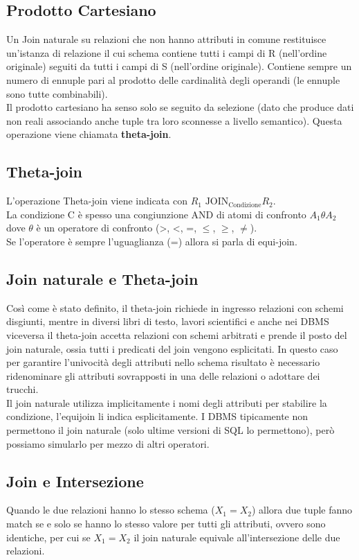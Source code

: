 \subsection*{Prodotto Cartesiano}
Un Join naturale su relazioni che non hanno attributi in comune restituisce un'istanza di 
relazione il cui schema contiene tutti i campi di R (nell'ordine originale) seguiti da tutti
i campi di S (nell'ordine originale). Contiene sempre un numero di ennuple pari al prodotto delle
cardinalità degli operandi (le ennuple sono tutte combinabili).\\
Il prodotto cartesiano ha senso solo se seguito da selezione (dato che produce dati non reali associando
anche tuple tra loro sconnesse a livello semantico). Questa operazione viene chiamata \textbf{theta-join}.
\subsection*{Theta-join}
L'operazione Theta-join viene indicata con $R_1 \,\, \text{JOIN}_{\text{Condizione}}R_2$.\\
La condizione C è spesso una congiunzione AND di atomi di confronto $A_1 \theta A_2$ dove $\theta$ è un
operatore di confronto (>, <, =, $\leq$, $\geq$, $\neq$).\\
Se l'operatore è sempre l'uguaglianza (=) allora si parla di equi-join.\\
\subsection*{Join naturale e Theta-join}
Così come è stato definito, il theta-join richiede in ingresso relazioni con schemi disgiunti,
mentre in diversi libri di testo, lavori scientifici e anche nei DBMS viceversa il theta-join 
accetta relazioni con schemi arbitrati e prende il posto del join naturale, ossia tutti i predicati
del join vengono esplicitati. In questo caso per garantire l'univocità degli attributi nello schema
risultato è necessario ridenominare gli attributi sovrapposti in una delle relazioni o adottare
dei trucchi.\\
Il join naturale utilizza implicitamente i nomi degli attributi per stabilire la condizione,
l'equijoin li indica esplicitamente. I DBMS tipicamente non permettono il join naturale
(solo ultime versioni di SQL lo permettono), però possiamo simularlo per mezzo di altri operatori.
\subsection*{Join e Intersezione}
Quando le due relazioni hanno lo stesso schema ($X_1 = X_2$) allora due tuple fanno match
se e solo se hanno lo stesso valore per tutti gli attributi, ovvero sono identiche, per cui
se $X_1 = X_2$ il join naturale equivale all'intersezione delle due relazioni.

